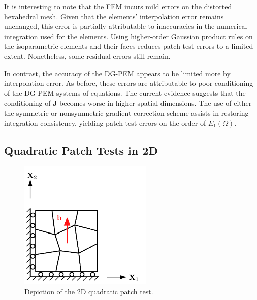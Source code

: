 It is interesting to note that the FEM incurs mild errors on the distorted hexahedral mesh. Given that the elements' interpolation error remains unchanged, this error is partially attributable to inaccuracies in the numerical integration used for the elements. Using higher-order Gaussian product rules on the isoparametric elements and their faces reduces patch test errors to a limited extent. Nonetheless, some residual errors still remain.

In contrast, the accuracy of the DG-PEM appears to be limited more by interpolation error. As before, these errors are attributable to poor conditioning of the DG-PEM systems of equations. The current evidence suggests that the conditioning of $\mathbf{J}$ becomes worse in higher spatial dimensions. The use of either the symmetric or nonsymmetric gradient correction scheme assists in restoring integration consistency, yielding patch test errors on the order of $E_1 (\Omega)$.

\subsection*{Quadratic Patch Tests in 2D}

\begin{figure}[!h]
    \centering
    \includegraphics[width=2.5in]{figures/quadratic_patch_test.pdf}
    	\caption{Depiction of the 2D quadratic patch test.}
    \label{fig:quadratic_patch_test}
\end{figure}


